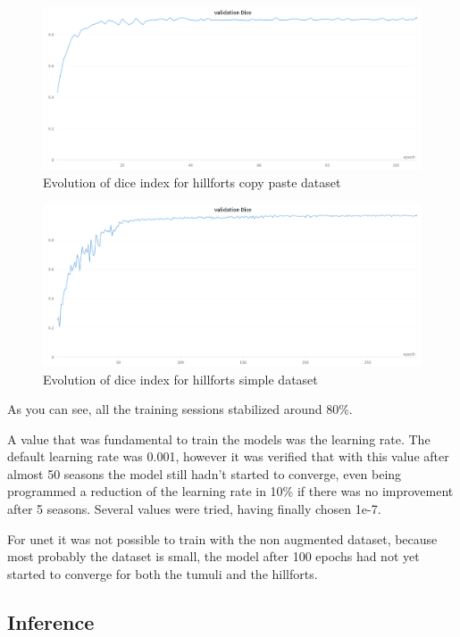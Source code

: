 \begin{figure}[H]
\centering
\includegraphics[width=12cm]{images/unet/castros_copy.png}
\caption{Evolution of dice index for hillforts copy paste dataset}
\end{figure}

\begin{figure}[H]
\centering
\includegraphics[width=12cm]{images/unet/castros_simple.png}
\caption{Evolution of dice index for hillforts simple dataset}
\end{figure}

As you can see, all the training sessions stabilized around 80\%.

A value that was fundamental to train the models was the learning rate. The default learning rate was 0.001, however it was verified that with this value after almost 50 seasons the model still hadn't started to converge, even being programmed a reduction of the learning rate in 10\% if there was no improvement after 5 seasons. Several values were tried, having finally chosen 1e-7.

For unet it was not possible to train with the non augmented dataset, because most probably the dataset is small, the model after 100 epochs had not yet started to converge for both the tumuli and the hillforts.


\subsection{Inference}

